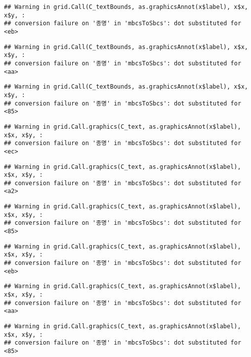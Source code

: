 \documentclass[
]{article}
\begin{document}
\begin{verbatim}
## Warning in grid.Call(C_textBounds, as.graphicsAnnot(x$label), x$x, x$y, :
## conversion failure on '종명' in 'mbcsToSbcs': dot substituted for <eb>
\end{verbatim}

\begin{verbatim}
## Warning in grid.Call(C_textBounds, as.graphicsAnnot(x$label), x$x, x$y, :
## conversion failure on '종명' in 'mbcsToSbcs': dot substituted for <aa>
\end{verbatim}

\begin{verbatim}
## Warning in grid.Call(C_textBounds, as.graphicsAnnot(x$label), x$x, x$y, :
## conversion failure on '종명' in 'mbcsToSbcs': dot substituted for <85>
\end{verbatim}

\begin{verbatim}
## Warning in grid.Call.graphics(C_text, as.graphicsAnnot(x$label), x$x, x$y, :
## conversion failure on '종명' in 'mbcsToSbcs': dot substituted for <ec>
\end{verbatim}

\begin{verbatim}
## Warning in grid.Call.graphics(C_text, as.graphicsAnnot(x$label), x$x, x$y, :
## conversion failure on '종명' in 'mbcsToSbcs': dot substituted for <a2>
\end{verbatim}

\begin{verbatim}
## Warning in grid.Call.graphics(C_text, as.graphicsAnnot(x$label), x$x, x$y, :
## conversion failure on '종명' in 'mbcsToSbcs': dot substituted for <85>
\end{verbatim}

\begin{verbatim}
## Warning in grid.Call.graphics(C_text, as.graphicsAnnot(x$label), x$x, x$y, :
## conversion failure on '종명' in 'mbcsToSbcs': dot substituted for <eb>
\end{verbatim}

\begin{verbatim}
## Warning in grid.Call.graphics(C_text, as.graphicsAnnot(x$label), x$x, x$y, :
## conversion failure on '종명' in 'mbcsToSbcs': dot substituted for <aa>
\end{verbatim}

\begin{verbatim}
## Warning in grid.Call.graphics(C_text, as.graphicsAnnot(x$label), x$x, x$y, :
## conversion failure on '종명' in 'mbcsToSbcs': dot substituted for <85>
\end{verbatim}
\end{document}
